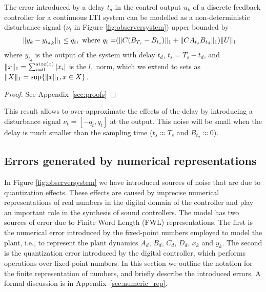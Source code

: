 \documentclass[sigconf]{llncs}
\DeclarePairedDelimiter\norm{\lVert}{\rVert}
\newcommand{\mat}[1]{{#1}}
\renewcommand{\vec}[1]{{#1}}
\begin{document}
\begin{theorem}
The error introduced by a delay $t_d$ in the control output $\vec{u}_k$ of a discrete feedback controller for a continuous LTI system can be modelled as a non-deterministic disturbance signal ($\nu_t$ in Figure \ref{fig:observersystem}) upper bounded by 
\begin{align}
\norm{\vec{y}_{k}-{\vec{y}_{t_d}}_{k}}_1 \leq q_t, \text{ where } q_t=&(\norm{\mat{C}(\mat{B}_{T_s}-\mat{B}_{t_s})}_1+\norm{\mat{C}\mat{A}_{t_s}\mat{B}_{t_d}}_1)\norm{U}_1
\end{align}
where $\vec{y}_{t_d}$ is the output of the system with delay $t_d$, $t_s=T_s-t_d$,
and $\norm{\vec{x}}_1=\sum_{i=0}^{size(\vec{x})} |\vec{x}_i|$ is the $l_1$ norm, 
which we extend to sets as $\norm{X}_1 = \sup \{\norm{\vec{x}}_1, \vec{x} \in X\}$.  
\end{theorem}
%
\begin{proof}
See Appendix~\ref{sec:proofs}
\end{proof}
This result allows to over-approximate the effects of the delay by introducing a disturbance signal $\nu_t=[-q_t, q_t]$ at the output.
 This noise will be small when the delay is much smaller than the sampling time ($t_s\approx T_s$ and $\mat{B}_{t_d} \approx 0$).

\subsection{Errors generated by numerical representations} 
\label{sec:numeric_rep2}

In Figure \ref{fig:observersystem} we have introduced sources of noise that are due to quantization effects.  
These effects are caused by imprecise numerical representations of real numbers in the digital domain of the controller and play an important role in the synthesis of sound controllers. 
The model has two sources of error due to Finite Word Length (FWL) representations. 
The first is the numerical error introduced by the fixed-point numbers employed to model the plant, 
i.e., to represent the plant dynamics $A_d$, $B_d$, $C_d$, $D_d$, $x_k$ and $y_k$. 
The second is the quantization error introduced by the digital controller, 
which performs operations over fixed-point numbers.  
In this section we outline the notation for the finite representation of numbers, 
and briefly describe the introduced errors.  
A formal discussion is in Appendix~\ref{sec:numeric_rep}.
\end{document}
